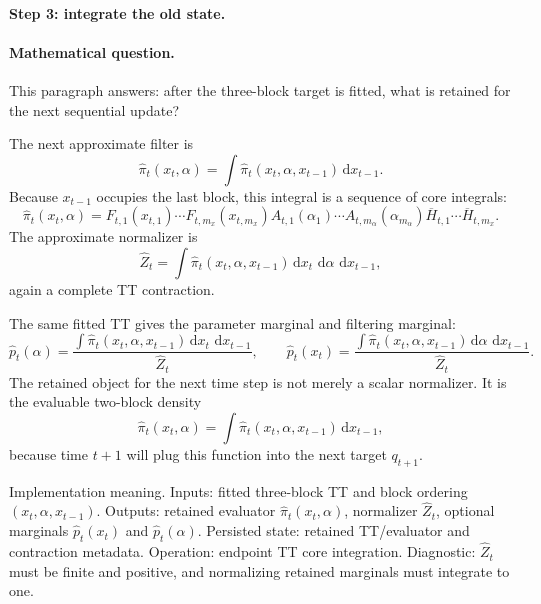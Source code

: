 \documentclass[11pt]{article}
\numberwithin{equation}{section}
\newcommand{\dd}{\,\mathrm d}
\begin{document}
\paragraph{Step 3: integrate the old state.}
\paragraph{Mathematical question.}
This paragraph answers: after the three-block target is fitted, what is
retained for the next sequential update?

The next approximate filter is
\begin{equation}
    \widehat\pi_t(x_t,\alpha)
    =
    \int \widehat\pi_t(x_t,\alpha,x_{t-1})\dd x_{t-1}.
    \label{eq:p24-a1-3}
\end{equation}
Because \(x_{t-1}\) occupies the last block, this integral is a sequence of core
integrals:
\begin{equation}
    \widehat\pi_t(x_t,\alpha)
    =
    F_{t,1}(x_{t,1})\cdots F_{t,m_x}(x_{t,m_x})
    A_{t,1}(\alpha_1)\cdots A_{t,m_\alpha}(\alpha_{m_\alpha})
    \overline H_{t,1}\cdots \overline H_{t,m_x}.
    \label{eq:p24-a1-4}
\end{equation}
The approximate normalizer is
\begin{equation}
    \widehat Z_t
    =
    \int \widehat\pi_t(x_t,\alpha,x_{t-1})
    \dd x_t\,\dd\alpha\,\dd x_{t-1},
    \label{eq:p24-a1-5}
\end{equation}
again a complete TT contraction.

The same fitted TT gives the parameter marginal and filtering marginal:
\begin{equation}
    \widehat p_t(\alpha)
    =
    \frac{\int\widehat\pi_t(x_t,\alpha,x_{t-1})
    \dd x_t\,\dd x_{t-1}}
    {\widehat Z_t},
    \qquad
    \widehat p_t(x_t)
    =
    \frac{\int\widehat\pi_t(x_t,\alpha,x_{t-1})
    \dd\alpha\,\dd x_{t-1}}
    {\widehat Z_t}.
    \label{eq:p24-a1-6}
\end{equation}
The retained object for the next time step is not merely a scalar
normalizer.  It is the evaluable two-block density
\begin{equation}
    \widehat\pi_t(x_t,\alpha)
    =
    \int\widehat\pi_t(x_t,\alpha,x_{t-1})\dd x_{t-1},
    \label{eq:p24-a1-7}
\end{equation}
because time \(t+1\) will plug this function into the next target
\(q_{t+1}\).

Implementation meaning. Inputs: fitted three-block TT and block ordering
\((x_t,\alpha,x_{t-1})\).  Outputs: retained evaluator
\(\widehat\pi_t(x_t,\alpha)\), normalizer \(\widehat Z_t\), optional marginals
\(\widehat p_t(x_t)\) and \(\widehat p_t(\alpha)\).  Persisted state: retained
TT/evaluator and contraction metadata.  Operation: endpoint TT core
integration.  Diagnostic: \(\widehat Z_t\) must be finite and positive, and
normalizing retained marginals must integrate to one.
\end{document}
